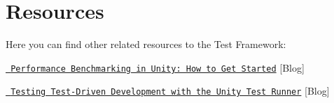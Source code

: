\chapter{Resources}
\hypertarget{md__hey_tea_9_2_library_2_package_cache_2com_8unity_8test-framework_0d1_81_833_2_documentation_0i_2resources}{}\label{md__hey_tea_9_2_library_2_package_cache_2com_8unity_8test-framework_0d1_81_833_2_documentation_0i_2resources}
\label{md__hey_tea_9_2_library_2_package_cache_2com_8unity_8test-framework_0d1_81_833_2_documentation_0i_2resources_autotoc_md4381}%
%
 Here you can find other related resources to the  Test Framework\+:


\begin{DoxyItemize}
\item \href{https://blogs.unity3d.com/2018/09/25/performance-benchmarking-in-unity-how-to-get-started/}{\texttt{ Performance Benchmarking in Unity\+: How to Get Started}} \mbox{[}Blog\mbox{]}
\item \href{https://blogs.unity3d.com/2018/11/02/testing-test-driven-development-with-the-unity-test-runner/}{\texttt{ Testing Test-\/\+Driven Development with the Unity Test Runner}} \mbox{[}Blog\mbox{]} 
\end{DoxyItemize}